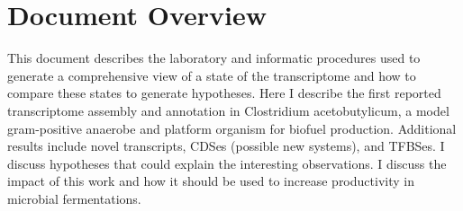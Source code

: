 \section{Document Overview}
This document describes the laboratory and informatic procedures used to generate a comprehensive view of a state of the transcriptome and how to compare these states to generate hypotheses. Here I describe the first reported transcriptome assembly and annotation in Clostridium acetobutylicum, a model gram-positive anaerobe and platform organism for biofuel production. Additional results include novel transcripts, CDSes (possible new systems), and TFBSes. I discuss hypotheses that could explain the interesting observations. I discuss the impact of this work and how it should be used to increase productivity in microbial fermentations.